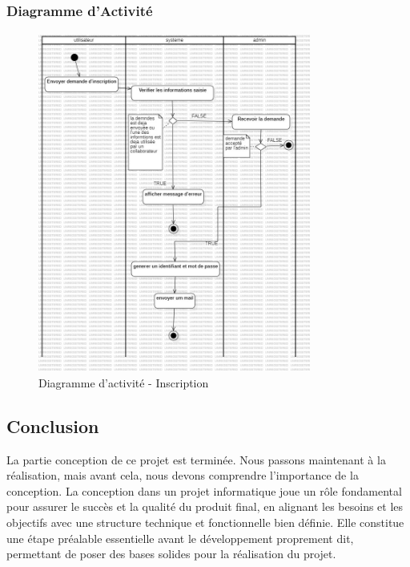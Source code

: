 \documentclass{article}
\begin{document}
            \subsubsection{Diagramme d'Activité}
                \begin{figure}[h!]
                    \centering
                    \includegraphics[width=0.8\textwidth]{assets/diagrammes/ActivityDiagram.jpg}
                    \caption{Diagramme d'activité - Inscription}
                \end{figure}
                \FloatBarrier
        \subsection{Conclusion}
                La partie conception de ce projet est terminée. Nous passons maintenant à la réalisation, mais avant cela, nous devons comprendre l'importance de la conception. 
                La conception dans un projet informatique joue un rôle fondamental pour assurer le succès et la qualité du produit final, 
                en alignant les besoins et les objectifs avec une structure technique et fonctionnelle bien définie. 
                Elle constitue une étape préalable essentielle avant le développement proprement dit, 
                permettant de poser des bases solides pour la réalisation du projet.
    
\end{document}
